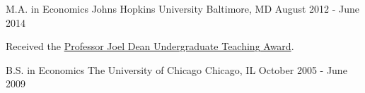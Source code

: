 


\begin{cventries}


\cventry
{M.A. in Economics} %
{Johns Hopkins University} %
{Baltimore, MD} %
{August 2012 - June 2014} %
{ %
	\begin{cvitems}
		\item {Received the \href{https://econ.jhu.edu/wp-content/uploads/sites/27/2011/06/JHUEconNewsletter_2014.pdf}{Professor Joel Dean Undergraduate Teaching Award}.}
	\end{cvitems}
}

\cventry
{B.S. in Economics} %
{The University of Chicago} %
{Chicago, IL} %
{October 2005 - June 2009} %
{ %
\begin{cvitems}
\end{cvitems}
}


\end{cventries}